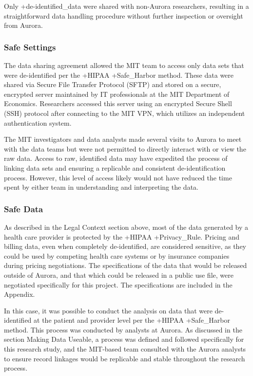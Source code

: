 \documentclass[
]{WileySix}
\begin{document}
Only +de-identified\_data\textbar{} were shared with non-Aurora researchers, resulting in a straightforward data handling procedure without further inspection or oversight from Aurora.

\hypertarget{safe-settings-4}{%
\subsubsection{Safe Settings}\label{safe-settings-4}}

The data sharing agreement allowed the MIT team to access only data sets that were de-identified per the +HIPAA\textbar{} +Safe\_Harbor\textbar{} method. These data were shared via Secure File Transfer Protocol (SFTP) and stored on a secure, encrypted server maintained by IT professionals at the MIT Department of Economics. Researchers accessed this server using an encrypted Secure Shell (SSH) protocol after connecting to the MIT VPN, which utilizes an independent authentication system.

The MIT investigators and data analysts made several visits to Aurora to meet with the data teams but were not permitted to directly interact with or view the raw data. Access to raw, identified data may have expedited the process of linking data sets and ensuring a replicable and consistent de-identification process. However, this level of access likely would not have reduced the time spent by either team in understanding and interpreting the data.

\hypertarget{safe-data-4}{%
\subsubsection{Safe Data}\label{safe-data-4}}

As described in the Legal Context section above, most of the data generated by a health care provider is protected by the +HIPAA\textbar{} +Privacy\_Rule\textbar. Pricing and billing data, even when completely de-identified, are considered sensitive, as they could be used by competing health care systems or by insurance companies during pricing negotiations. The specifications of the data that would be released outside of Aurora, and that which could be released in a public use file, were negotiated specifically for this project. The specifications are included in the Appendix.

In this case, it was possible to conduct the analysis on data that were de-identified at the patient and provider level per the +HIPAA\textbar{} +Safe\_Harbor\textbar{} method. This process was conducted by analysts at Aurora. As discussed in the section Making Data Useable, a process was defined and followed specifically for this research study, and the MIT-based team consulted with the Aurora analysts to ensure record linkages would be replicable and stable throughout the research process.
\end{document}
